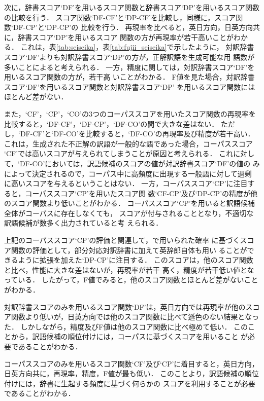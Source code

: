 \documentclass[japanese]{jnlp_1.3a}
\begin{document}
次に，辞書スコア`DF'を用いるスコア関数と辞書スコア`DP'を用いるスコア関数
の比較を行う．
スコア関数`DF-CF'と`DP-CF'を比較し，同様に，スコア関数`DF-CP'と`DP-CP'の
比較を行う．
再現率を比べると，英日方向，日英方向共に，辞書スコア`DP'を用いるスコア
関数の方が再現率が若干高いことがわかる．
これは，表\ref{tab:seiseika}，表\ref{tab:fujii_seiseika}で示したように，
対訳辞書スコア`DF'よりも対訳辞書スコア`DP'の方が，正解訳語を生成可能な用
語数が多いことによると考えられる．
一方，精度に関しては，対訳辞書スコア`DF'を用いるスコア関数の方が，若干高
いことがわかる．
F値を見た場合，対訳辞書スコア`DF'を用いるスコア関数と対訳辞書スコア`DP'
を用いるスコア関数にはほとんど差がない．

また，`CF'，`CP'，`CO'の3つのコーパススコアを用いたスコア関数の再現率を
比較すると，`DF-CF'，`DF-CP'，`DF-CO'の間で大きな差はない．
ただし，`DF-CF'と`DF-CO'を比較すると，`DF-CO'の再現率及び精度が若干高い．
これは，生成された不正解の訳語が一般的な語であった場合，コーパススコア
`CF'では高いスコアが与えられてしまうことが原因と考えられる．
これに対して，`DF-CO'においては，訳語候補のスコアの値が対訳辞書スコア`DF'の値の
みによって決定されるので，コーパス中に高頻度に出現する一般語に対して過剰
に高いスコアを与えるということはない．
一方，コーパススコア`CP'に注目すると，コーパススコア`CP'を用いたスコア関
数`CF-CP'及び`DP-CP'の精度が他のスコア関数より低いことがわかる．
コーパススコア`CP'を用いると訳語候補全体がコーパスに存在しなくても，
スコアが付与されることとなり，不適切な訳語候補が数多く出力されていると考
えられる．

上記のコーパススコア`CP'の評価と関連して，\cite{Fujii00}で用いられた確率
に基づくスコア関数の評価として，部分対応対訳辞書に加えて英辞郎自体も用い
ることができるように拡張を加えた`DP-CP'に注目する．
このスコアは，他のスコア関数と比べ，性能に大きな差はないが，再現率が若干
高く，精度が若干低い値となっている．
したがって，F値でみると，他のスコア関数とほとんど差がないことがわかる．

対訳辞書スコアのみを用いるスコア関数`DF'は，英日方向では再現率が他のスコ
ア関数より低いが，日英方向では他のスコア関数に比べて遜色のない結果となっ
た．
しかしながら，精度及びF値は他のスコア関数に比べ極めて低い．
このことから，訳語候補の順位付けには，コーパスに基づくスコアを用いること
が必要であることがわかる．


コーパススコアのみを用いるスコア関数`CF'及び`CP'に着目すると，英日方向，
日英方向共に，再現率，精度，F値が最も低い．
このことより，訳語候補の順位付けには，辞書に生起する頻度に基づく何らかの
スコアを利用することが必要であることがわかる．
\end{document}
